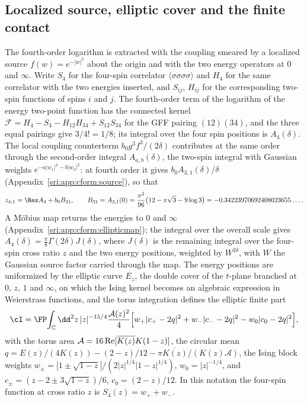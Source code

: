 \subsection{Localized source, elliptic cover and the finite contact}\label{sri:sec:source2}
The fourth-order logarithm is extracted with the coupling smeared by a localized source $f(w)=e^{-|w|^2}$ about the
origin and with the two energy operators at $0$ and $\infty$. Write $S_4$ for the four-spin correlator
$\langle\sigma\sigma\sigma\sigma\rangle$ and $H_4$ for the same correlator with the two energies inserted, and $S_{ij}$,
$H_{ij}$ for the corresponding two-spin functions of spins $i$ and $j$. The fourth-order term of the logarithm of the
energy two-point function has the connected kernel $\mathcal F=H_4-S_4-H_{12}H_{34}+S_{12}S_{34}$ for the GFF pairing
$(12)(34)$, and the three equal pairings give $3/4!=1/8$; its integral over the four spin positions is $A_4(\delta)$.
The local coupling counterterm $b_0g^3f^3/(2\delta)$ contributes at the same order through the second-order integral
$A_{a,b}(\delta)$, the two-spin integral with Gaussian weights $e^{-a|w_1|^2-b|w_2|^2}$: at fourth order it gives
$b_0A_{3,1}(\delta)/\delta$ (Appendix~\ref{sri:app:cform:source}), so that
\begin{equation}
 z_{4,1}=\Res A_4+b_0B_{31},\qquad B_{31}=A_{3,1}(0)=\frac{\pi^2}{96}\bigl(12-\pi\sqrt3-9\log3\bigr)=-0.34223970692408023655\ldots.
\end{equation}
A M\"obius map returns the energies to $0$ and $\infty$ (Appendix~\ref{sri:app:cform:ellipticmap}); the integral over the
overall scale gives $A_4(\delta)=\frac\pi8\Gamma(2\delta)J(\delta)$, where $J(\delta)$ is the remaining integral over the
four-spin cross ratio $z$ and the two energy positions, weighted by $W^{2\delta}$, with $W$ the Gaussian source factor
carried through the map. The energy positions are uniformized by the elliptic curve $E_z$, the double cover of the $t$-plane branched at
$0$, $z$, $1$ and $\infty$, on which the
Ising kernel becomes an algebraic expression in Weierstrass functions, and the torus integration defines the
elliptic finite part
\begin{equation}
 \cI=\FP\!\int_{\mathbb C}\dd^2z\,|z|^{-15/4}\frac{\mathcal A(z)^2}{4}
 \Bigl[w_+|c_+-2q|^2+w_-|c_--2q|^2-w_0|c_0-2q|^2\Bigr],
 \label{sri:eq:I}
\end{equation}
with the torus area $\mathcal A=16\,{\rm Re}[\overline{K(z)}K(1-z)]$, the circular mean
$q=E(z)/(4K(z))-(2-z)/12-\pi\overline{K(z)}/(K(z)\mathcal A)$, the Ising block weights
$w_\pm=|1\pm\sqrt{1-z}|/(2|z|^{1/4}|1-z|^{1/4})$, $w_0=|z|^{-1/4}$, and $c_\pm=(z-2\pm3\sqrt{1-z})/6$,
$c_0=(2-z)/12$. In this notation the four-spin function at cross ratio $z$ is $S_4(z)=w_++w_-$.

